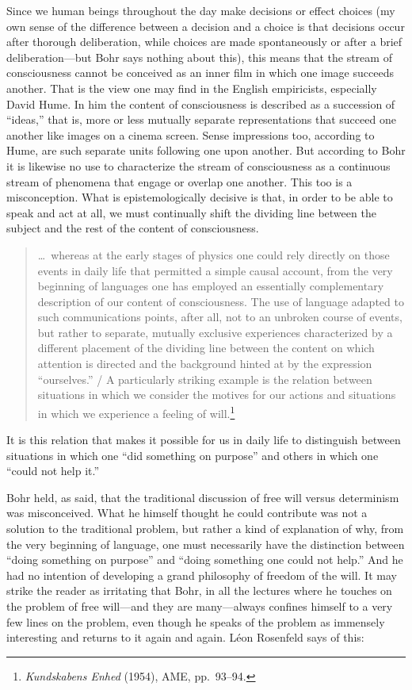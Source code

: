 \documentclass[12pt,a4paper]{book}
\begin{document}
Since we human beings throughout the day make decisions or effect choices (my own sense of the difference between a decision and a choice is that decisions occur after thorough deliberation, while choices are made spontaneously or after a brief deliberation---but Bohr says nothing about this), this means that the stream of consciousness cannot be conceived as an inner film in which one image succeeds another. That is the view one may find in the English empiricists, especially David Hume. In him the content of consciousness is described as a succession of ``ideas,'' that is, more or less mutually separate representations that succeed one another like images on a cinema screen. Sense impressions too, according to Hume, are such separate units following one upon another. But according to Bohr it is likewise no use to characterize the stream of consciousness as a continuous stream of phenomena that engage or overlap one another. This too is a misconception. What is epistemologically decisive is that, in order to be able to speak and act at all, we must continually shift the dividing line between the subject and the rest of the content of consciousness.

\begin{quote}
\dots\ whereas at the early stages of physics one could rely directly on those events in daily life that permitted a simple causal account, from the very beginning of languages one has employed an essentially complementary description of our content of consciousness. The use of language adapted to such communications points, after all, not to an unbroken course of events, but rather to separate, mutually exclusive experiences characterized by a different placement of the dividing line between the content on which attention is directed and the background hinted at by the expression ``ourselves.'' / A particularly striking example is the relation between situations in which we consider the motives for our actions and situations in which we experience a feeling of will.\footnote{\emph{Kundskabens Enhed} (1954), AME, pp.~93--94.}
\end{quote}

It is this relation that makes it possible for us in daily life to distinguish between situations in which one ``did something on purpose'' and others in which one ``could not help it.''

Bohr held, as said, that the traditional discussion of free will versus determinism was misconceived. What he himself thought he could contribute was not a solution to the traditional problem, but rather a kind of explanation of why, from the very beginning of language, one must necessarily have the distinction between ``doing something on purpose'' and ``doing something one could not help.'' And he had no intention of developing a grand philosophy of freedom of the will. It may strike the reader as irritating that Bohr, in all the lectures where he touches on the problem of free will---and they are many---always confines himself to a very few lines on the problem, even though he speaks of the problem as immensely interesting and returns to it again and again. Léon Rosenfeld says of this:
\end{document}
